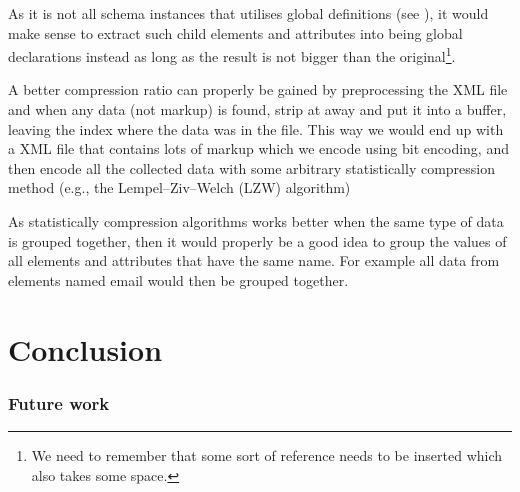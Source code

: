 \documentclass[a4paper, oneside]{memoir}
\theoremstyle{definition}
\begin{document}
\begin{description}
\item[Refactoring] As it is not all schema instances that utilises global
  definitions (see \label{sec:local-global-schema-definitions}), it would make
  sense to extract such child elements and attributes into being global
  declarations instead as long as the result is not bigger than the
  original\footnote{We need to remember that some sort of reference needs to be inserted
    which also takes some space.}.


\item A better compression ratio can properly be gained by preprocessing the XML
  file and when any data (not markup) is found, strip at away and put it into a
  buffer, leaving the index where the data was in the file. This way we would
  end up with a XML file that contains lots of markup which we encode using bit
  encoding, and then encode all the collected data with some arbitrary
  statistically compression method (e.g., the Lempel–Ziv–Welch (LZW) algorithm)

  As statistically compression algorithms works better when the same type of
  data is grouped together, then it would properly be a good idea to group the
  values of all elements and attributes that have the same name. For example all
  data from elements named email would then be grouped together.

\end{description}

\chapter{Conclusion}
\label{sec:conclusion}

\subsection{Future work}


\clearpage



\end{document}
